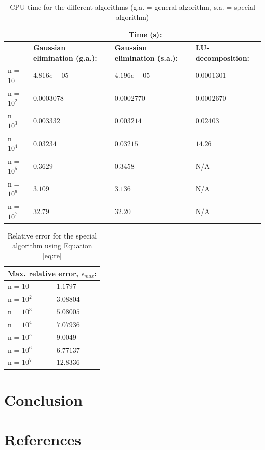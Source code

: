 \documentclass{article}
\begin{document}
\begin{table}[]
\begin{tabular}{llll}
           & \multicolumn{3}{c}{\textbf{Time (s):}}                                                                  \\ \hline
           & \textbf{Gaussian elimination (g.a.):} & \textbf{Gaussian elimination (s.a.):} & \textbf{LU-decomposition:} \\ \hline
n = $10$   & $4.816e-05$                              & $4.196e-05$                              & $0.0001301$       \\
n = $10^2$  & $0.0003078$                              & $0.0002770$                              & $0.0002670$       \\
n = $10^3$ & $0.003332$                               & $0.003214$                               & $0.02403$         \\
n = $10^4$ & $0.03234$                                & $0.03215$                                & $14.26$           \\
n = $10^5$ & $0.3629$                                 & $0.3458$                                 & N/A               \\
n = $10^6$ & $3.109$                                  & $3.136$                                  & N/A               \\
n = $10^7$ & $32.79$                                  & $32.20$                                  & N/A              
\end{tabular}
\label{tab:1}
\caption{CPU-time for the different algorithms (g.a. = general algorithm, s.a. = special algorithm)}
\end{table}

\begin{table}[]
\centering
\begin{tabular}{ll}
\multicolumn{2}{c}{\textbf{Max. relative error, $\epsilon_{max}$:}} \\ \hline
n = $10$                                  & $1.1797$                                \\
n = $10^2$                                & $3.08804$                               \\
n = $10^3$                                & $5.08005$                               \\
n = $10^4$                                & $7.07936$                               \\
n = $10^5$                                & $9.0049$                                \\
n = $10^6$                                & $6.77137$                               \\
n = $10^7$                                & $12.8336$                              
\end{tabular}
\label{tab:2}
\caption{Relative error for the special algorithm using Equation \ref{eq:re}}
\end{table}


\section{Conclusion}

\section{References}
\end{document}
